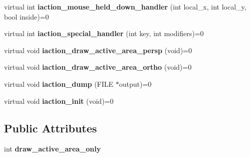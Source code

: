 \begin{DoxyCompactItemize}
\item 
\hypertarget{class_g_l_u_i___mouse___interaction_ab10a2bbd829a80e7403d722e4e3b480d}{virtual int {\bfseries iaction\+\_\+mouse\+\_\+held\+\_\+down\+\_\+handler} (int local\+\_\+x, int local\+\_\+y, bool inside)=0}\label{class_g_l_u_i___mouse___interaction_ab10a2bbd829a80e7403d722e4e3b480d}

\item 
\hypertarget{class_g_l_u_i___mouse___interaction_a738d6fd0afea5a76b45fe2a3c24c4e64}{virtual int {\bfseries iaction\+\_\+special\+\_\+handler} (int key, int modifiers)=0}\label{class_g_l_u_i___mouse___interaction_a738d6fd0afea5a76b45fe2a3c24c4e64}

\item 
\hypertarget{class_g_l_u_i___mouse___interaction_a4c7473fb5849e7d13052100aac56a9f3}{virtual void {\bfseries iaction\+\_\+draw\+\_\+active\+\_\+area\+\_\+persp} (void)=0}\label{class_g_l_u_i___mouse___interaction_a4c7473fb5849e7d13052100aac56a9f3}

\item 
\hypertarget{class_g_l_u_i___mouse___interaction_aba702d0d46375ab194c7b07d93051b0d}{virtual void {\bfseries iaction\+\_\+draw\+\_\+active\+\_\+area\+\_\+ortho} (void)=0}\label{class_g_l_u_i___mouse___interaction_aba702d0d46375ab194c7b07d93051b0d}

\item 
\hypertarget{class_g_l_u_i___mouse___interaction_a99dd43b2224bbfee6aadee3cf15c1fdd}{virtual void {\bfseries iaction\+\_\+dump} (F\+I\+L\+E $\ast$output)=0}\label{class_g_l_u_i___mouse___interaction_a99dd43b2224bbfee6aadee3cf15c1fdd}

\item 
\hypertarget{class_g_l_u_i___mouse___interaction_a4be4e3ae7948824b2af30c2b87f434fd}{virtual void {\bfseries iaction\+\_\+init} (void)=0}\label{class_g_l_u_i___mouse___interaction_a4be4e3ae7948824b2af30c2b87f434fd}

\end{DoxyCompactItemize}
\subsection*{Public Attributes}
\begin{DoxyCompactItemize}
\item 
\hypertarget{class_g_l_u_i___mouse___interaction_a1ac48da74085fbff71aab99f2e51b280}{int {\bfseries draw\+\_\+active\+\_\+area\+\_\+only}}\label{class_g_l_u_i___mouse___interaction_a1ac48da74085fbff71aab99f2e51b280}

\end{DoxyCompactItemize}
